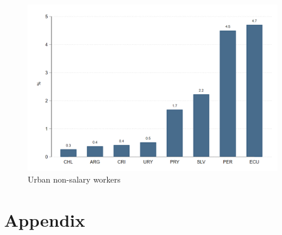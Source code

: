 \documentclass[english]{article}
\begin{document}
  \begin{figure}[H]
        \justifying
        \caption{Urban non-salary workers}     
       \centerline{\includegraphics[scale=.3]{latex/figures/Snapshot/Urban_non_salary_share.png}}
        \label{fig:Nonsalarycosts}
       
 \end{figure}

 


\newpage
\section{Appendix}
\end{document}
